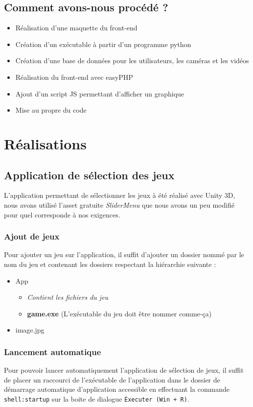\documentclass[12pt]{article}
\begin{document}
\subsection{Comment avons-nous procédé ?}
\begin{itemize}
     \item Réalisation d’une maquette du front-end
     \item Création d’un exécutable à partir d’un programme python
     \item Création d’une base de données pour les utilisateurs, les caméras et les vidéos
     \item Réalisation du front-end avec easyPHP
     \item Ajout d’un script JS permettant d’afficher un graphique
     \item Mise au propre du code
\end{itemize}

\clearpage

\section{Réalisations}
\subsection{Application de sélection des jeux}
L'application permettant de sélectionner  les jeux à été réalisé avec Unity 3D, nous avons utilisé l'asset gratuite \textit{SliderMenu} que nous avons un peu modifié pour quel corresponde à nos exigences.

\subsubsection{Ajout de jeux}
Pour ajouter un jeu sur l'application, il suffit d'ajouter un dossier nommé par le nom du jeu et contenant les dossiers respectant la hiérarchie suivante :
\begin{itemize}
    \item App
    \begin{itemize}
        \item \textit{Contient les fichiers du jeu}
        \item \textbf{game.exe} (L'exécutable du jeu doit être nommer comme-ça)
    \end{itemize}
    \item image.jpg
\end{itemize}
\subsubsection{Lancement automatique}
Pour pouvoir lancer automatiquement l'application de sélection de jeux, il suffit de placer un raccourci de l'exécutable de l'application dans le dossier de démarrage automatique d'application accessible en effectuant la commande \texttt{shell:startup} sur la boite de dialogue \texttt{Éxecuter (Win + R)}.
\end{document}
